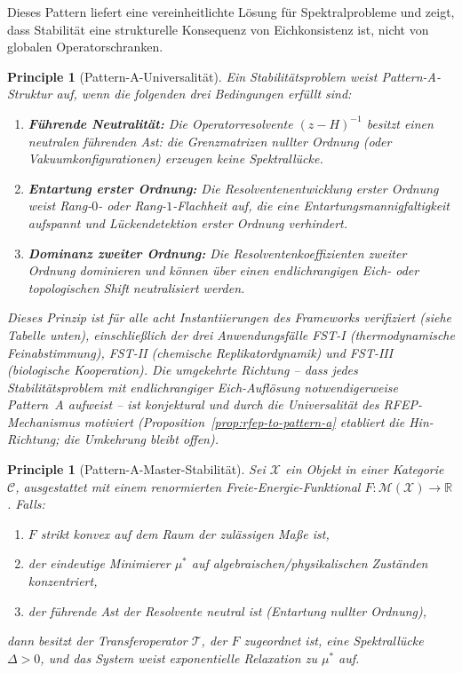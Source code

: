 \documentclass[12pt,a4paper]{article}
\newtheorem{principle}[theorem]{Principle}
\theoremstyle{definition}
\theoremstyle{remark}
\begin{document}
Dieses Pattern liefert eine vereinheitlichte Lösung für Spektralprobleme und zeigt, dass Stabilität eine strukturelle Konsequenz von Eichkonsistenz ist, nicht von globalen Operatorschranken.

\begin{principle}[Pattern-A-Universalität]
\label{thm:pattern-a-universality}
Ein Stabilitätsproblem weist Pattern-A-Struktur auf, wenn die folgenden drei Bedingungen erfüllt sind:
\begin{enumerate}[label=(\roman*)]
    \item \textbf{Führende Neutralität:} Die Operatorresolvente $(z - H)^{-1}$ besitzt einen neutralen führenden Ast: die Grenzmatrizen nullter Ordnung (oder Vakuumkonfigurationen) erzeugen keine Spektrallücke.
    \item \textbf{Entartung erster Ordnung:} Die Resolventenentwicklung erster Ordnung weist Rang-$0$- oder Rang-$1$-Flachheit auf, die eine Entartungsmannigfaltigkeit aufspannt und Lückendetektion erster Ordnung verhindert.
    \item \textbf{Dominanz zweiter Ordnung:} Die Resolventenkoeffizienten zweiter Ordnung dominieren und können über einen endlichrangigen Eich- oder topologischen Shift neutralisiert werden.
\end{enumerate}
Dieses Prinzip ist für alle acht Instantiierungen des Frameworks verifiziert (siehe Tabelle unten), einschließlich der drei Anwendungsfälle FST-I (thermodynamische Feinabstimmung), FST-II (chemische Replikatordynamik) und FST-III (biologische Kooperation). Die umgekehrte Richtung -- dass jedes Stabilitätsproblem mit endlichrangiger Eich-Auflösung notwendigerweise Pattern~A aufweist -- ist konjektural und durch die Universalität des RFEP-Mechanismus motiviert (Proposition~\ref{prop:rfep-to-pattern-a} etabliert die Hin-Richtung; die Umkehrung bleibt offen).
\end{principle}

\begin{principle}[Pattern-A-Master-Stabilität]
\label{princ:master-stability}
Sei $\mathcal{X}$ ein Objekt in einer Kategorie $\mathcal{C}$, ausgestattet mit einem renormierten Freie-Energie-Funktional $F: \mathcal{M}(\mathcal{X}) \to \mathbb{R}$. Falls:
\begin{enumerate}
\item $F$ strikt konvex auf dem Raum der zulässigen Maße ist,
\item der eindeutige Minimierer $\mu^*$ auf algebraischen/physikalischen Zuständen konzentriert,
\item der führende Ast der Resolvente neutral ist (Entartung nullter Ordnung),
\end{enumerate}
dann besitzt der Transferoperator $\mathcal{T}$, der $F$ zugeordnet ist, eine Spektrallücke $\Delta > 0$, und das System weist exponentielle Relaxation zu $\mu^*$ auf.
\end{principle}
\end{document}
